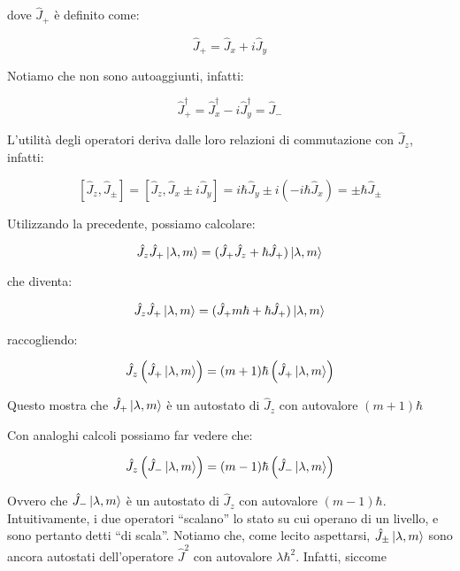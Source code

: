 dove $\hat{J}_+$ \`e definito come:

	\[
		\hat{J}_+ = \hat{J}_x + i \hat{J}_y
	\]

Notiamo che non sono autoaggiunti, infatti:

	\[
		\hat{J}^\dagger_+ = \hat{J}^\dagger_x - i \hat{J}^\dagger_y = \hat{J}_-
	\]

L'utilit\`a degli operatori deriva dalle loro relazioni di commutazione con $\hat{J}_z$, infatti:

	\begin{equation}
		\left [ \hat{J}_z, \hat{J}_\pm \right ] = \left [ \hat{J}_z, \hat{J}_x \pm i \hat{J}_y \right ] = i \hbar \hat{J}_y \pm
			i ( -i \hbar \hat{J}_x ) = \pm \hbar \hat{J}_\pm
	\end{equation}

Utilizzando la precedente, possiamo calcolare:

	\begin{equation}
		\hat{J}_z \hat{J}_+ \ket{ \lambda, m} = ( \hat{J}_+ \hat{J}_z + \hbar \hat{J}_+ ) \ket{\lambda, m}
	\end{equation}

che diventa:

	\begin{equation}
		\hat{J}_z \hat{J}_+ \ket{\lambda, m} = (\hat{J}_+ m \hbar + \hbar \hat{J}_+ ) \ket{\lambda, m}
	\end{equation}

raccogliendo:

	\begin{equation}
		\hat{J}_z \left ( \hat{J}_+ \ket{\lambda, m} \right ) = (m + 1) \hbar \left ( \hat{J}_+ \ket{\lambda, m} \right )
	\end{equation}

Questo mostra che $\hat{J}_+ \ket{\lambda, m}$ \`e un autostato di $\hat{J}_z$ con autovalore $(m+1) \hbar$

Con analoghi calcoli possiamo far vedere che:

	\begin{equation}
		\hat{J}_z \left ( \hat{J}_- \ket{\lambda, m} \right ) = (m - 1) \hbar \left ( \hat{J}_- \ket{\lambda, m} \right )
	\end{equation}

Ovvero che $\hat{J}_- \ket{\lambda, m}$ \`e un autostato di $\hat{J}_z$ con autovalore $(m-1) \hbar$. Intuitivamente, i due operatori ``scalano'' lo stato su cui operano di un livello, e sono pertanto detti ``di scala''.
Notiamo che, come lecito aspettarsi, $\hat{J}_\pm \ket{\lambda, m}$ sono ancora autostati dell'operatore $\hat{J}^2$ con autovalore $\lambda \hbar^2$. Infatti, siccome

